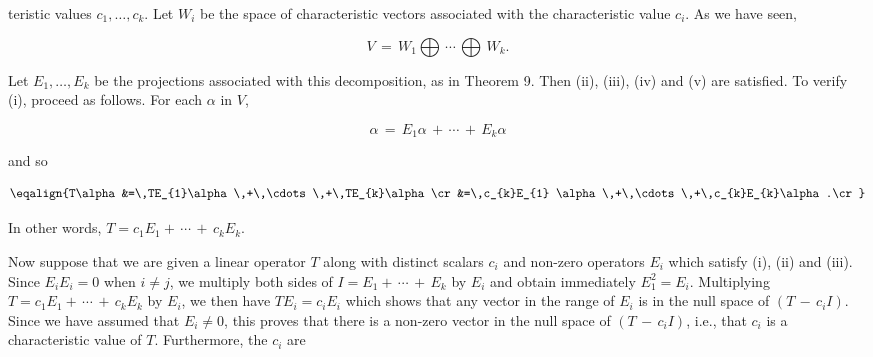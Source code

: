 teristic values \(c_{1},\ldots,c_{k}\). Let \(W_{i}\) be the space of characteristic vectors associated with the characteristic value \(c_{i}\). As we have seen,

\[V\,=\,W_{1}\bigoplus\,\cdots\,\bigoplus\,W_{k}.\]

Let \(E_{1},\ldots,E_{k}\) be the projections associated with this decomposition, as in Theorem 9. Then (ii), (iii), (iv) and (v) are satisfied. To verify (i), proceed as follows. For each \(\alpha\) in \(V\),

\[\alpha\,=\,E_{1}\alpha\,+\,\cdots\,+\,E_{k}\alpha\]

and so

\[\eqalign{T\alpha&=\,TE_{1}\alpha\,+\,\cdots\,+\,TE_{k}\alpha\cr&=\,c_{k}E_{1} \alpha\,+\,\cdots\,+\,c_{k}E_{k}\alpha.\cr}\]

In other words, \(T=c_{1}E_{1}+\,\cdots\,+\,c_{k}E_{k}\).

Now suppose that we are given a linear operator \(T\) along with distinct scalars \(c_{i}\) and non-zero operators \(E_{i}\) which satisfy (i), (ii) and (iii). Since \(E_{i}E_{i}=0\) when \(i\neq j\), we multiply both sides of \(I=E_{1}+\,\cdots\,+\,E_{k}\) by \(E_{i}\) and obtain immediately \(E_{1}^{2}=E_{i}\). Multiplying \(T=c_{1}E_{1}+\,\cdots\,+\,c_{k}E_{k}\) by \(E_{i}\), we then have \(TE_{i}=c_{i}E_{i}\) which shows that any vector in the range of \(E_{i}\) is in the null space of \((T\,-\,c_{i}I)\). Since we have assumed that \(E_{i}\neq 0\), this proves that there is a non-zero vector in the null space of \((T\,-\,c_{i}I)\), i.e., that \(c_{i}\) is a characteristic value of \(T\). Furthermore, the \(c_{i}\) are 
